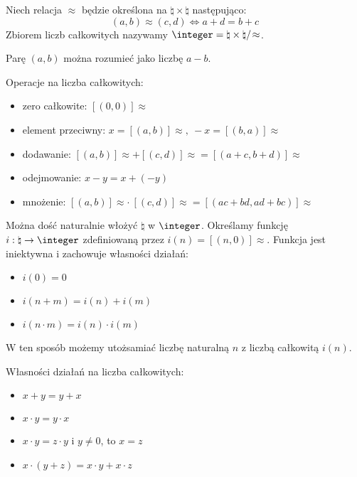\begin{definition}
    Niech relacja \( \approx \) będzie określona na \( \natural \times \natural \) następująco:
    \[
        (a, b) \approx (c, d) \iff a + d = b + c
    \]
    Zbiorem liczb całkowitych nazywamy \( \integer = \natural \times \natural /\!\approx \).
\end{definition}
Parę \( (a, b) \) można rozumieć jako liczbę \( a - b \).

Operacje na liczba całkowitych:
\begin{itemize}
    \item zero całkowite: \( [(0, 0)]\!\approx \)
    \item element przeciwny: \( x = [(a, b)]\!\approx, \ -x = [(b, a)]\!\approx \)
    \item dodawanie: \( [(a, b)]\!\approx + [(c, d)]\!\approx = [(a + c, b + d)]\!\approx \)
    \item odejmowanie: \( x - y = x + (-y) \)
    \item mnożenie: \( [(a, b)]\!\approx \cdot\: [(c, d)]\!\approx = [(ac + bd, ad + bc)]\!\approx \)
\end{itemize}

Można dość naturalnie włożyć \( \natural \) w \( \integer \). Określamy funkcję \( i : \natural \rightarrow \integer \) zdefiniowaną przez \( i(n) = [(n, 0)]\!\approx \).
Funkcja jest iniektywna i zachowuje własności działań:
\begin{itemize}
    \item \( i(0) = 0 \)
    \item \( i(n + m) = i(n) + i(m) \)
    \item \( i(n \cdot m) = i(n) \cdot i(m) \)
\end{itemize}
W ten sposób możemy utożsamiać liczbę naturalną \( n \) z liczbą całkowitą \( i(n) \).

Własności działań na liczba całkowitych:
\begin{itemize}
    \item \( x + y = y + x \)
    \item \( x \cdot y = y \cdot x \)
    \item \( x \cdot y = z \cdot y \) i \( y \ne 0 \), to \( x = z \)
    \item \( x \cdot (y + z) = x \cdot y + x \cdot z \)
\end{itemize}